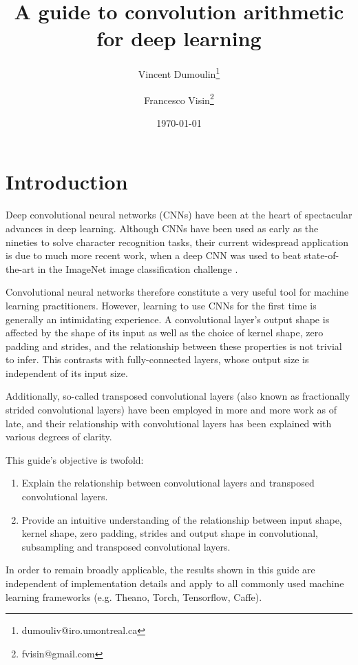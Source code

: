 \documentclass{report}
\title{A guide to convolution arithmetic for deep learning}
\author[*]{Vincent Dumoulin\thanks{dumouliv@iro.umontreal.ca}}
\author[*]{Francesco Visin\thanks{fvisin@gmail.com}}
\affil[*]{MILA, Universit\'{e} de Montr\'{e}al}
\date{\today}
\begin{document}
\maketitle

\chapter{Introduction}

Deep convolutional neural networks (CNNs) have been at the heart of spectacular
advances in deep learning. Although CNNs have been used as early as the nineties
\citep{lecun1998gradient} to solve character recognition tasks, their current
widespread application is due to much more recent work, when a deep CNN was used
to beat state-of-the-art in the ImageNet image classification challenge
\citep{krizhevsky2012imagenet}.

Convolutional neural networks therefore constitute a very useful tool for
machine learning practitioners. However, learning to use CNNs for the first time
is generally an intimidating experience. A convolutional layer's output shape is
affected by the shape of its input as well as the choice of kernel shape, zero
padding and strides, and the relationship between these properties is not
trivial to infer. This contrasts with fully-connected layers, whose output size
is independent of its input size.

Additionally, so-called transposed convolutional layers (also known as
fractionally strided convolutional layers) have been employed in more and more
work as of late, and their relationship with convolutional layers has been
explained with various degrees of clarity.

This guide's objective is twofold:

\begin{enumerate}
    \item Explain the relationship between convolutional layers and transposed
        convolutional layers.
    \item Provide an intuitive understanding of the relationship between input
        shape, kernel shape, zero padding, strides and output shape in
        convolutional, subsampling and transposed convolutional layers.
\end{enumerate}

In order to remain broadly applicable, the results shown in this guide are
independent of implementation details and apply to all commonly used machine
learning frameworks (e.g. Theano, Torch, Tensorflow, Caffe).
\end{document}
